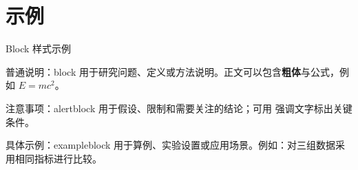 %

\section{示例}

\begin{frame}{Block 样式示例}
  \begin{block}{普通说明：block}
    用于研究问题、定义或方法说明。正文可以包含\textbf{粗体}与公式，例如 $E=mc^2$。
  \end{block}

  \begin{alertblock}{注意事项：alertblock}
    用于假设、限制和需要关注的结论；可用 \alert{强调文字}标出关键条件。
  \end{alertblock}

  \begin{exampleblock}{具体示例：exampleblock}
    用于算例、实验设置或应用场景。例如：对三组数据采用相同指标进行比较。
  \end{exampleblock}
\end{frame}

